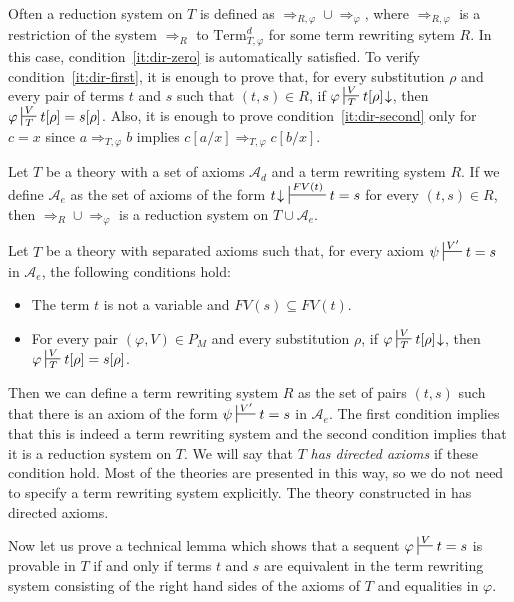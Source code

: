 \documentclass[reqno]{amsart}
\theoremstyle{definition}
\theoremstyle{remark}
\newcommand{\Term}{\mathrm{Term}}
\numberwithin{figure}{section}
\begin{document}
\begin{remark}
Often a reduction system on $T$ is defined as $\Rightarrow_{R,\varphi} \cup \Rightarrow_\varphi$,
where $\Rightarrow_{R,\varphi}$ is a restriction of the system $\Rightarrow_R$ to $\Term^d_{T,\varphi}$ for some term rewriting sytem $R$.
In this case, condition~\eqref{it:dir-zero} is automatically satisfied.
To verify condition~\eqref{it:dir-first}, it is enough to prove that, for every substitution $\rho$ and every pair of terms $t$ and $s$ such that $(t,s) \in R$,
if $\varphi \sststile{T}{V} t[\rho]\!\downarrow$, then $\varphi \sststile{T}{V} t[\rho] = s[\rho]$.
Also, it is enough to prove condition~\eqref{it:dir-second} only for $c = x$ since $a \Rightarrow_{T,\varphi} b$ implies $c[a/x] \Rightarrow_{T,\varphi} c[b/x]$.
\end{remark}

\begin{example}[dir-ax]
Let $T$ be a theory with a set of axioms $\mathcal{A}_d$ and a term rewriting system $R$.
If we define $\mathcal{A}_e$ as the set of axioms of the form $t\!\downarrow\ \sststile{}{FV(t)} t = s$ for every $(t,s) \in R$,
then $\Rightarrow_R \cup \Rightarrow_\varphi$ is a reduction system on $T \cup \mathcal{A}_e$.
\end{example}

Let $T$ be a theory with separated axioms such that, for every axiom $\psi \sststile{}{V'} t = s$ in $\mathcal{A}_e$, the following conditions hold:
\begin{itemize}
\item The term $t$ is not a variable and $FV(s) \subseteq FV(t)$.
\item For every pair $(\varphi,V) \in P_M$ and every substitution $\rho$, if $\varphi \sststile{T}{V} t[\rho]\!\downarrow$, then $\varphi \sststile{T}{V} t[\rho] = s[\rho]$.
\end{itemize}
Then we can define a term rewriting system $R$ as the set of pairs $(t,s)$ such that there is an axiom of the form $\psi \sststile{}{V'} t = s$ in $\mathcal{A}_e$.
The first condition implies that this is indeed a term rewriting system and the second condition implies that it is a reduction system on $T$.
We will say that $T$ \emph{has directed axioms} if these condition hold.
Most of the theories are presented in this way, so we do not need to specify a term rewriting system explicitly.
The theory constructed in  has directed axioms.

Now let us prove a technical lemma which shows that a sequent $\varphi \sststile{}{V} t = s$ is provable in $T$ if and only if
terms $t$ and $s$ are equivalent in the term rewriting system consisting of the right hand sides of the axioms of $T$ and equalities in $\varphi$.
\end{document}

